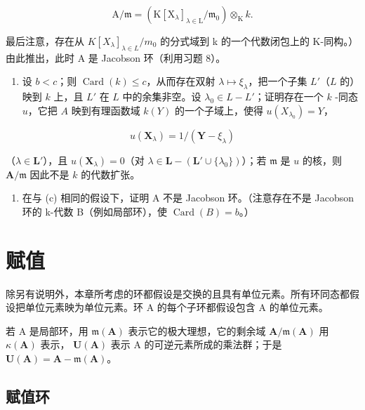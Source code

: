\[
\mathrm{A} / \mathfrak {m} = (\mathrm{K} [ \mathrm{X} _ {\lambda} ] _ {\lambda \in \mathrm{L}} / \mathfrak {m} _ {0}) \otimes_ {\mathrm{K}} k.
\]

最后注意，存在从 \(K[X_{\lambda}]_{\lambda \in L}/m_{0}\) 的分式域到 k 的一个代数闭包上的 K-同构。）由此推出，此时 A 是 Jacobson 环（利用习题 8）。

\begin{enumerate}
\def\labelenumi{(\alph{enumi})}
\setcounter{enumi}{2}
\tightlist
\item
  设 \(b < c\)；则 \(\operatorname{Card}(k) \leqslant c\)，从而存在双射 \(\lambda \mapsto \xi_{\lambda}\)，把一个子集 \(L'\)（\(L\) 的）映到 \(k\) 上，且 \(L'\) 在 \(L\) 中的余集非空。设 \(\lambda_0 \in L - L'\)；证明存在一个 \(k\) -同态 \(u\)，它把 \(A\) 映到有理函数域 \(k(Y)\) 的一个子域上，使得 \(u(X_{\lambda_0}) = Y\)，
\end{enumerate}

\[
u (\mathbf {X} _ {\lambda}) = 1 / (\mathbf {Y} - \xi_ {\lambda})
\]

（\(\lambda \in \mathbf{L}'\)），且 \(u(\mathbf{X}_{\lambda}) = 0\)（对 \(\lambda \in \mathbf{L} - (\mathbf{L}' \cup \{\lambda_0\})\)）；若 \(\mathfrak{m}\) 是 \(u\) 的核，则 \(\mathbf{A} / \mathfrak{m}\) 因此不是 \(k\) 的代数扩张。

\begin{enumerate}
\def\labelenumi{(\alph{enumi})}
\setcounter{enumi}{3}
\tightlist
\item
  在与 (c) 相同的假设下，证明 A 不是 Jacobson 环。（注意存在不是 Jacobson 环的 k-代数 B（例如局部环），使 \(\operatorname{Card}(B) = b\)。）
\end{enumerate}


\chapter{赋值}

除另有说明外，本章所考虑的环都假设是交换的且具有单位元素。所有环同态都假设把单位元素映为单位元素。环 A 的每个子环都假设包含 A 的单位元素。

若 A 是局部环，用 \(\mathfrak{m}(\mathbf{A})\) 表示它的极大理想，它的剩余域 \(\mathbf{A}/\mathfrak{m}(\mathbf{A})\) 用 \(\kappa(\mathbf{A})\) 表示， \(\mathbf{U}(\mathbf{A})\) 表示 A 的可逆元素所成的乘法群；于是 \(\mathbf{U}(\mathbf{A}) = \mathbf{A} - \mathfrak{m}(\mathbf{A})\)。

\section{赋值环}

